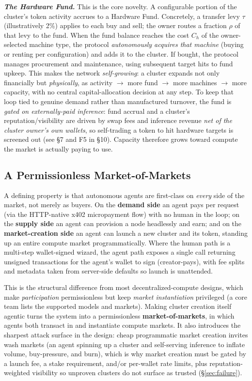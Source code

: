 \documentclass[11pt]{article}
\newcommand{\ph}[1]{\textbf{\textit{#1}}}
\begin{document}
\ph{The Hardware Fund.} This is the core novelty. A configurable portion of the cluster's token activity accrues to a Hardware Fund. Concretely, a transfer levy $\tau$ (illustratively 2\%) applies to each buy and sell; the owner routes a fraction $\rho$ of that levy to the fund. When the fund balance reaches the cost $C_h$ of the owner-selected machine type, the protocol \textit{autonomously acquires that machine} (buying or renting per configuration) and adds it to the cluster. If bought, the protocol manages procurement and maintenance, using subsequent target hits to fund upkeep. This makes the network \textit{self-growing}: a cluster expands not only financially but \textit{physically}, as activity $\rightarrow$ more fund $\rightarrow$ more machines $\rightarrow$ more capacity, with no central capital-allocation decision at any step. To keep that loop tied to genuine demand rather than manufactured turnover, the fund is \textit{gated on externally-paid inference}: fund accrual and a cluster's reputation/visibility are driven by swap fees and inference revenue \textit{net of the cluster owner's own wallets}, so self-trading a token to hit hardware targets is screened out (see \S7 and F5 in \S10). Capacity therefore grows toward compute the market is actually paying to use.

\subsection{A Permissionless Market-of-Markets}
A defining property is that autonomous agents are first-class on \textit{every} side of the market, not merely as buyers. On the \textbf{demand side} an agent pays per request (via the HTTP-native x402 micropayment flow) with no human in the loop; on the \textbf{supply side} an agent can provision a node headlessly and earn; and on the \textbf{market-creation side} an agent can launch a new cluster and its token, standing up an entire compute market programmatically. Where the human path is a multi-step wallet-signed wizard, the agent path exposes a single call returning unsigned transactions for the agent's wallet to sign (creator-pays), with fee splits and metadata taken from server-side defaults so launch is unattended.

This is the structural difference from most decentralized-compute designs, which make \textit{participation} permissionless but keep \textit{market instantiation} privileged (a core team lists the supported models and markets). Making cluster creation itself agentic turns the system into a permissionless \textbf{market-of-markets}, in which agents both transact in and instantiate compute markets. It also introduces the sharpest attack surface in the design: cheap programmatic market creation invites wash markets (an agent spinning up a cluster and self-serving inference to inflate volume, buy-pressure, and burn), which is why market creation must be gated by a launch fee, a stake requirement, and/or per-wallet rate limits, plus reputation-weighted visibility so unproven clusters do not surface as trusted (\S\ref{sec:failure}).
\end{document}
